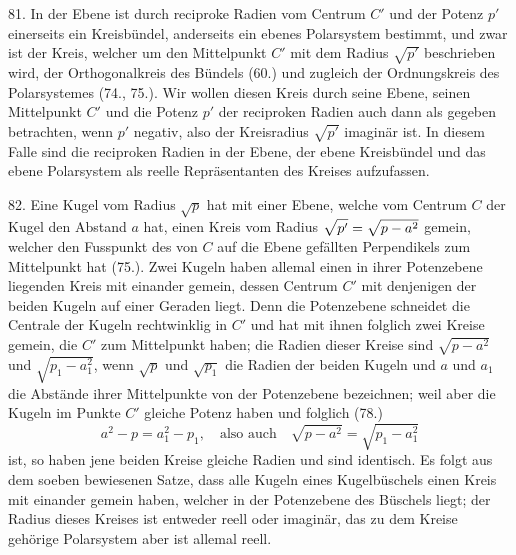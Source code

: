 81. In der Ebene ist durch reciproke Radien vom
Centrum $C'$ und der Potenz $p'$ einerseits ein Kreisb\"undel,
anderseits ein ebenes Polarsystem bestimmt, und zwar ist
der Kreis, welcher um den Mittelpunkt $C'$ mit dem Radius
$\sqrt{p'}$ beschrieben wird, der Orthogonalkreis des B\"undels (60.)
und zugleich der Ordnungskreis des Polarsystemes (74., 75.).
Wir wollen diesen Kreis durch seine Ebene, seinen Mittelpunkt
$C'$ und die Potenz $p'$ der reciproken Radien auch
dann als gegeben betrachten, wenn $p'$ negativ, also der
Kreisradius $\sqrt{p'}$ imagin\"ar ist. In diesem Falle sind die reciproken
Radien in der Ebene, der ebene Kreisb\"undel und das
ebene Polarsystem als reelle Repr\"asentanten des Kreises
aufzufassen.

82. Eine Kugel vom Radius $\sqrt{p}$ hat mit einer Ebene,
welche vom Centrum $C$ der Kugel den Abstand $a$ hat, einen
Kreis vom Radius $\sqrt{p'\vphantom{a^2}} = \sqrt{p-a^2}$ gemein, welcher den
Fusspunkt des von $C$ auf die Ebene gef\"allten Perpendikels
zum Mittelpunkt hat (75.). Zwei Kugeln haben allemal einen
in ihrer Potenzebene liegenden Kreis mit einander gemein,
dessen Centrum $C'$ mit denjenigen der beiden Kugeln auf
einer Geraden liegt. Denn die Potenzebene schneidet die
Centrale der Kugeln rechtwinklig in $C'$ und hat mit ihnen
folglich zwei Kreise gemein, die $C'$ zum Mittelpunkt haben;
die Radien dieser Kreise sind $\sqrt{p-a^2}$ und $\sqrt{p_1-a_1^2}$, wenn
$\sqrt{p}$ und $\sqrt{p_1}$ die Radien der beiden Kugeln und $a$ und $a_1$
die Abst\"ande ihrer Mittelpunkte von der Potenzebene bezeichnen;
weil aber die Kugeln im Punkte $C'$ gleiche Potenz
haben und folglich (78.)
\[
a^2-p = a_1^2-p_1, \quad\text{also auch}\quad \sqrt{p-a^2} = \sqrt{p_1-a_1^2}
\]
ist, so haben jene beiden Kreise gleiche Radien und sind
identisch. Es folgt aus dem soeben bewiesenen Satze, dass
alle Kugeln eines Kugelb\"uschels einen Kreis mit einander
gemein haben, welcher in der Potenzebene des B\"uschels
liegt; der Radius dieses Kreises ist entweder reell oder imagin\"ar,
das zu dem Kreise geh\"orige Polarsystem aber ist allemal
reell.

\begin{center}
\makebox[15em]{\hrulefill}
\end{center}


\label{p9}


